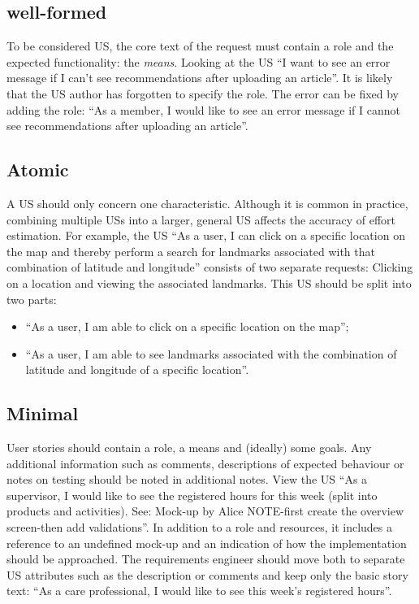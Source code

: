 \subsection*{\normalsize{well-formed}}
To be considered US, the core text of the request must contain a role and the expected functionality: the \emph{means}. Looking at the US \enquote{I want to see an error message if I can't see recommendations after uploading an article}. It is likely that the US author has forgotten to specify the role. The error can be fixed by adding the role: \enquote{As a member, I would like to see an error message if I cannot see recommendations after uploading an article}.
\subsection*{\normalsize{Atomic}}
A US should only concern one characteristic. Although it is common in practice, combining multiple USs into a larger, general US affects the accuracy of effort estimation\cite{liskin2014we}. For example, the US \enquote{As a user, I can click on a specific location on the map and thereby perform a search for landmarks associated with that combination of latitude and longitude} consists of two separate requests: Clicking on a location and viewing the associated landmarks. This US should be split into two parts:
\begin{itemize}
\item  \enquote{As a user, I am able to click on a specific location on the map};
\item  \enquote{As a user, I am able to see landmarks associated with the combination of latitude and longitude of a specific location}.
\end{itemize}
\subsection*{\normalsize{Minimal}}
User stories should contain a role, a means and (ideally) some goals. Any additional information such as comments, descriptions of expected behaviour or notes on testing should be noted in additional notes. View the US \enquote{As a supervisor, I would like to see the registered hours for this week (split into products and activities). See: Mock-up by Alice NOTE-first create the overview screen-then add validations}. In addition to a role and resources, it includes a reference to an undefined mock-up and an indication of how the implementation should be approached. The requirements engineer should move both to separate US attributes such as the description or comments and keep only the basic story text: \enquote{As a care professional, I would like to see this week's registered hours}.
